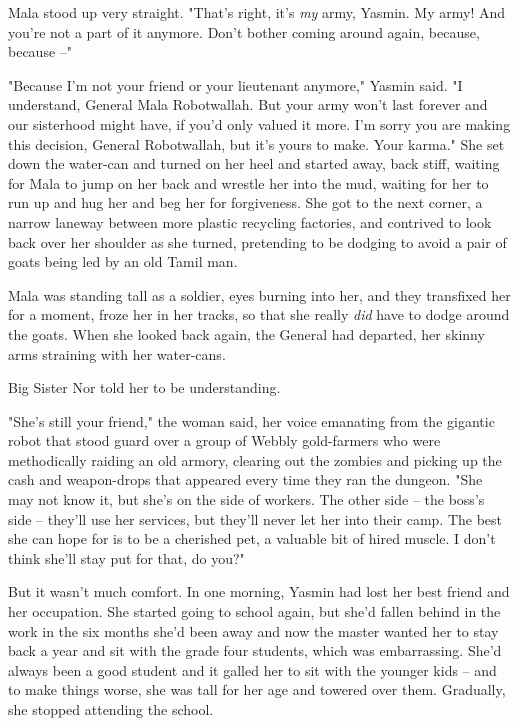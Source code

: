 Mala stood up very straight. "That's right, it's \emph{my} army,
Yasmin. My army! And you're not a part of it anymore. Don't bother
coming around again, because, because --"

"Because I'm not your friend or your lieutenant anymore," Yasmin
said. "I understand, General Mala Robotwallah. But your army won't
last forever and our sisterhood might have, if you'd only valued it
more. I'm sorry you are making this decision, General Robotwallah,
but it's yours to make. Your karma." She set down the water-can and
turned on her heel and started away, back stiff, waiting for Mala
to jump on her back and wrestle her into the mud, waiting for her
to run up and hug her and beg her for forgiveness. She got to the
next corner, a narrow laneway between more plastic recycling
factories, and contrived to look back over her shoulder as she
turned, pretending to be dodging to avoid a pair of goats being led
by an old Tamil man.

Mala was standing tall as a soldier, eyes burning into her, and
they transfixed her for a moment, froze her in her tracks, so that
she really \emph{did} have to dodge around the goats. When she
looked back again, the General had departed, her skinny arms
straining with her water-cans.

Big Sister Nor told her to be understanding.

"She's still your friend," the woman said, her voice emanating from
the gigantic robot that stood guard over a group of Webbly
gold-farmers who were methodically raiding an old armory, clearing
out the zombies and picking up the cash and weapon-drops that
appeared every time they ran the dungeon. "She may not know it, but
she's on the side of workers. The other side -- the boss's side --
they'll use her services, but they'll never let her into their
camp. The best she can hope for is to be a cherished pet, a
valuable bit of hired muscle. I don't think she'll stay put for
that, do you?"

But it wasn't much comfort. In one morning, Yasmin had lost her
best friend and her occupation. She started going to school again,
but she'd fallen behind in the work in the six months she'd been
away and now the master wanted her to stay back a year and sit with
the grade four students, which was embarrassing. She'd always been
a good student and it galled her to sit with the younger kids --
and to make things worse, she was tall for her age and towered over
them. Gradually, she stopped attending the school.

